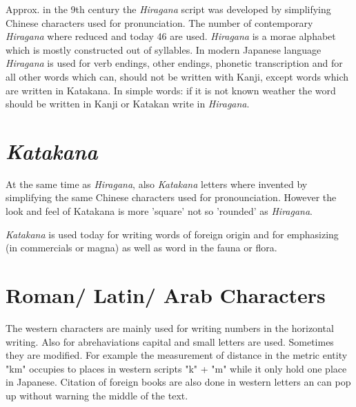 Approx. in the 9th century the \textit{Hiragana} script was developed by
simplifying Chinese characters used for pronunciation. The number of
contemporary \textit{Hiragana} where reduced and today 46 are used.
\textit{Hiragana} is a morae alphabet which is mostly constructed out of
syllables. In modern Japanese language \textit{Hiragana} is used for  verb
endings, other endings, phonetic transcription and for all other words which
can, should not be written with Kanji, except words which are written in
Katakana. In simple words: if it is not known weather the word should be
written in Kanji or Katakan write in \textit{Hiragana}.

\section*{\textit{Katakana}}

At the same time as \textit{Hiragana}, also  \textit{Katakana} letters where
invented by simplifying the same Chinese characters used for pronounciation.
However the look and feel of Katakana is more 'square' not so 'rounded' as
\textit{Hiragana}.

\textit{Katakana} is used today for writing words of foreign origin and for
emphasizing (in commercials or magna) as well as word in the fauna or flora. 

\section*{Roman/ Latin/ Arab Characters}

The western characters are mainly used for writing numbers in the horizontal
writing. Also for abrehaviations capital and small letters are used. Sometimes
they are modified. For example the measurement of distance in the metric entity
"km" occupies to places in western scripts "k" + "m" while it only hold one
place in Japanese. Citation of foreign books are also done in western letters
an can pop up without warning the middle of the text.
